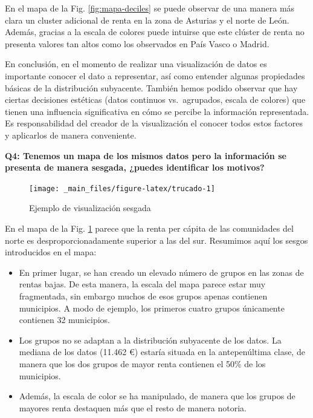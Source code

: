 \documentclass[
]{book}
\begin{document}
En el mapa de la Fig. \ref{fig:mapa-deciles} se puede observar de una manera
más clara un cluster adicional de renta en la zona de Asturias y el norte de
León. Además, gracias a la escala de colores puede intuirse que este clúster de
renta no presenta valores tan altos como los observados en País Vasco o Madrid.

En conclusión, en el momento de realizar una visualización de datos es
importante conocer el dato a representar, así como entender algunas propiedades
básicas de la distribución subyacente. También hemos podido observar que hay
ciertas decisiones estéticas (datos continuos vs.~agrupados, escala de colores)
que tienen una influencia significativa en cómo se percibe la información
representada. Es responsabilidad del creador de la visualización el conocer
todos estos factores y aplicarlos de manera conveniente.

\textbf{Q4: Tenemos un mapa de los mismos datos pero la información se presenta de
manera sesgada, ¿puedes identificar los motivos?}

\begin{figure}

{\centering \texttt{[image: \_main\_files/figure-latex/trucado-1]} 

}

\caption{Ejemplo de visualización sesgada}\label{fig:trucado}
\end{figure}

En el mapa de la Fig. \ref{fig:trucado} parece que la renta per cápita de las
comunidades del norte es desproporcionadamente superior a las del sur. Resumimos
aquí los sesgos introducidos en el mapa:

\begin{itemize}
\item
  En primer lugar, se han creado un elevado número de grupos en las zonas de
  rentas bajas. De esta manera, la escala del mapa parece estar muy
  fragmentada, sin embargo muchos de esos grupos apenas contienen municipios.
  A modo de ejemplo, los primeros cuatro grupos únicamente contienen 32
  municipios.
\item
  Los grupos no se adaptan a la distribución subyacente de los datos. La
  mediana de los datos (11.462 €) estaría situada en la antepenúltima clase,
  de manera que los dos grupos de mayor renta contienen el 50\% de los
  municipios.
\item
  Además, la escala de color se ha manipulado, de manera que los grupos de
  mayores renta destaquen más que el resto de manera notoria.
\end{itemize}
\end{document}
